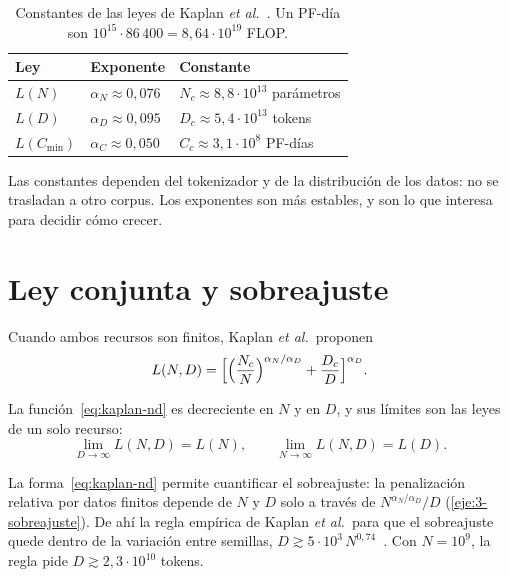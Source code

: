 \begin{table}[h]
\centering\small
\caption{Constantes de las leyes de Kaplan \emph{et al.}~\cite[§1.2]{kaplan}. Un PF-día son $10^{15}\cdot 86\,400=8{,}64\cdot 10^{19}$ FLOP.}\label{tab:kaplan}
\begin{tabular}{@{}lll@{}}
\toprule
Ley & Exponente & Constante \\
\midrule
$L(N)$ & $\alpha_N\approx 0{,}076$ & $N_c\approx 8{,}8\cdot 10^{13}$ parámetros \\
$L(D)$ & $\alpha_D\approx 0{,}095$ & $D_c\approx 5{,}4\cdot 10^{13}$ tokens \\
$L(C_{\min})$ & $\alpha_C\approx 0{,}050$ & $C_c\approx 3{,}1\cdot 10^{8}$ PF-días \\
\bottomrule
\end{tabular}
\end{table}

\addtocounter{definicion}{1}%

Las constantes dependen del tokenizador y de la distribución de los datos: no se trasladan a otro corpus. Los exponentes son más estables, y son lo que interesa para decidir cómo crecer.

\section{Ley conjunta y sobreajuste}

Cuando ambos recursos son finitos, Kaplan \emph{et al.}\ proponen~\cite[ecuación~(1.5) y §4]{kaplan}
\begin{equation}\label{eq:kaplan-nd}
L(N,D)=\Bigl[\Bigl(\frac{N_c}{N}\Bigr)^{\alpha_N/\alpha_D}+\frac{D_c}{D}\Bigr]^{\alpha_D}.
\end{equation}

\begin{proposicion}\label{prop:limites}
La función~\eqref{eq:kaplan-nd} es decreciente en $N$ y en $D$, y sus límites son las leyes de un solo recurso:
\[
\lim_{D\to\infty}L(N,D)=L(N),\qquad\lim_{N\to\infty}L(N,D)=L(D).
\]
\end{proposicion}

La forma~\eqref{eq:kaplan-nd} permite cuantificar el sobreajuste: la penalización relativa por datos finitos depende de $N$ y $D$ solo a través de $N^{\alpha_N/\alpha_D}/D$ (\cref{eje:3-sobreajuste}). De ahí la regla empírica de Kaplan \emph{et al.}\ para que el sobreajuste quede dentro de la variación entre semillas, $D\gtrsim 5\cdot 10^{3}\,N^{0{,}74}$~\cite[ecuación~(4.4)]{kaplan}. Con $N=10^{9}$, la regla pide $D\gtrsim 2{,}3\cdot 10^{10}$ tokens.

